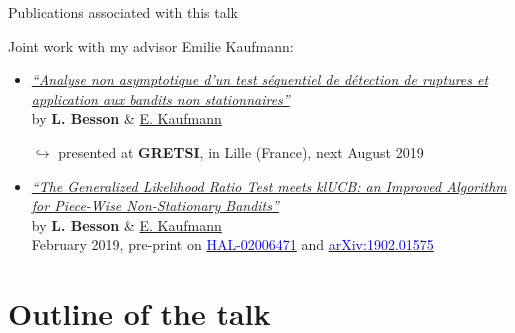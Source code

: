 \documentclass[11pt,english,ignorenonframetext,]{beamer}
\begin{document}
\begin{frame}{Publications associated with this talk}

  Joint work with my advisor Emilie Kaufmann:

  \begin{itemize}
    \item
      \href{https://hal.inria.fr/hal-02006471/document}{\emph{``Analyse non asymptotique d'un test séquentiel de détection de ruptures et application aux bandits non stationnaires''}}\\
      by \textbf{L. Besson} \&
      \href{http://chercheurs.lille.inria.fr/ekaufman/research.html}{E.
      Kaufmann}

      $\hookrightarrow$ presented at
      \textbf{GRETSI}, in Lille (France), next August 2019

    \vspace*{30pt}

    \item
      \href{https://hal.inria.fr/hal-02006471/document}{\emph{``The Generalized Likelihood Ratio Test meets klUCB: an Improved Algorithm for Piece-Wise Non-Stationary Bandits''}}\\
      by \textbf{L. Besson} \&
      \href{http://chercheurs.lille.inria.fr/ekaufman/research.html}{E.
      Kaufmann}\\
      February 2019,
      pre-print on
      \href{https://hal.inria.fr/hal-02006471}{\textcolor{blue}{HAL-02006471}}
      and
      \href{https://arxiv.org/abs/1902.01575}{\textcolor{blue}{arXiv:1902.01575}}

  \end{itemize}

\end{frame}


\section{\hfill{}Outline of the talk\hfill{}}
\end{document}
